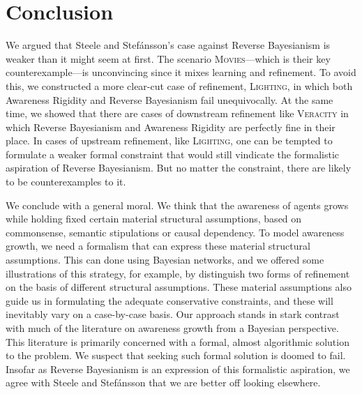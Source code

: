 \documentclass[
  11pt,
  dvipsnames,enabledeprecatedfontcommands]{scrartcl}
\begin{document}
\hypertarget{conclusion}{%
\section{Conclusion}\label{conclusion}}

We argued that Steele and Stefánsson's case against Reverse Bayesianism
is weaker than it might seem at first. The scenario
\textsc{Movies}---which is their key counterexample---is unconvincing
since it mixes learning and refinement. To avoid this, we constructed a
more clear-cut case of refinement, \textsc{Lighting}, in which both
Awareness Rigidity and Reverse Bayesianism fail unequivocally. At the
same time, we showed that there are cases of downstream refinement like
\textsc{Veracity} in which Reverse Bayesianism and Awareness Rigidity
are perfectly fine in their place. In cases of upstream refinement, like
\textsc{Lighting}, one can be tempted to formulate a weaker formal
constraint that would still vindicate the formalistic aspiration of
Reverse Bayesianism. But no matter the constraint, there are likely to
be counterexamples to it.

We conclude with a general moral. We think that the awareness of agents
grows while holding fixed certain material structural assumptions, based
on commonsense, semantic stipulations or causal dependency. To model
awareness growth, we need a formalism that can express these material
structural assumptions. This can done using Bayesian networks, and we
offered some illustrations of this strategy, for example, by distinguish
two forms of refinement on the basis of different structural
assumptions. These material assumptions also guide us in formulating the
adequate conservative constraints, and these will inevitably vary on a
case-by-case basis. Our approach stands in stark contrast with much of
the literature on awareness growth from a Bayesian perspective. This
literature is primarily concerned with a formal, almost algorithmic
solution to the problem. We suspect that seeking such formal solution is
doomed to fail. Insofar as Reverse Bayesianism is an expression of this
formalistic aspiration, we agree with Steele and Stefánsson that we are
better off looking elsewhere.
\end{document}
